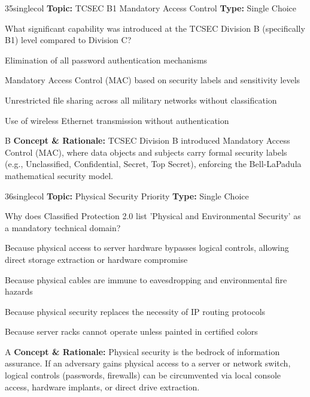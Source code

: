 \begin{qcard}{35}{singlecol}
\textcolor{darkslate!75}{\small\textbf{Topic:} TCSEC B1 Mandatory Access Control \hfill \textbf{Type:} Single Choice}\vspace{0.4em}\par
What significant capability was introduced at the TCSEC Division B (specifically B1) level compared to Division C?
\begin{qoptions}
\item Elimination of all password authentication mechanisms
\item Mandatory Access Control (MAC) based on security labels and sensitivity levels
\item Unrestricted file sharing across all military networks without classification
\item Use of wireless Ethernet transmission without authentication
\end{qoptions}
\end{qcard}
\nopagebreak
\begin{explainbox}{B}
\textbf{Concept \& Rationale:} TCSEC Division B introduced Mandatory Access Control (MAC), where data objects and subjects carry formal security labels (e.g., Unclassified, Confidential, Secret, Top Secret), enforcing the Bell-LaPadula mathematical security model.
\end{explainbox}

\begin{qcard}{36}{singlecol}
\textcolor{darkslate!75}{\small\textbf{Topic:} Physical Security Priority \hfill \textbf{Type:} Single Choice}\vspace{0.4em}\par
Why does Classified Protection 2.0 list 'Physical and Environmental Security' as a mandatory technical domain?
\begin{qoptions}
\item Because physical access to server hardware bypasses logical controls, allowing direct storage extraction or hardware compromise
\item Because physical cables are immune to eavesdropping and environmental fire hazards
\item Because physical security replaces the necessity of IP routing protocols
\item Because server racks cannot operate unless painted in certified colors
\end{qoptions}
\end{qcard}
\nopagebreak
\begin{explainbox}{A}
\textbf{Concept \& Rationale:} Physical security is the bedrock of information assurance. If an adversary gains physical access to a server or network switch, logical controls (passwords, firewalls) can be circumvented via local console access, hardware implants, or direct drive extraction.
\end{explainbox}

